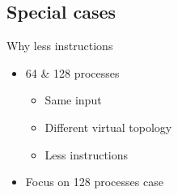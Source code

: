 \documentclass[aspectratio=169]{bredelebeamer}
\begin{document}
\subsection{Special cases}
\begin{frame}{Why less instructions}

\begin{itemize}
\item 64 \& 128 processes
\begin{itemize}
	\item Same input
	\item Different virtual topology
	\item Less instructions
\end{itemize}
\item Focus on 128 processes case

\end{itemize}

\end{frame}
\end{document}
